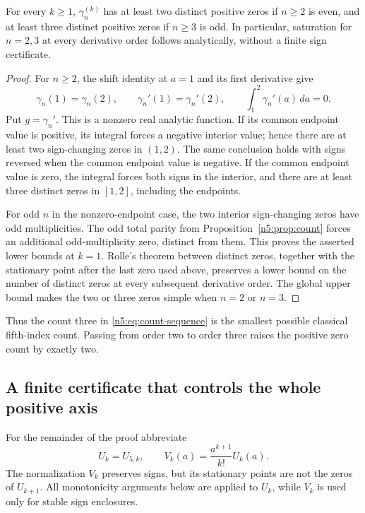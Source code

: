 \begin{proposition}
\label{n5:prop:lower}
For every $k\geq1$, $\gamma_n^{(k)}$ has at least two distinct positive
zeros if $n\geq2$ is even, and at least three distinct positive zeros if
$n\geq3$ is odd.  In particular, saturation for $n=2,3$ at every
derivative order follows analytically, without a finite sign certificate.
\end{proposition}
\begin{proof}
For $n\geq2$, the shift identity at $a=1$ and its first derivative give
\[
 \gamma_n(1)=\gamma_n(2),\qquad
 \gamma_n'(1)=\gamma_n'(2),\qquad
 \int_1^2\gamma_n'(a)\,da=0.
\]
Put $g=\gamma_n'$.  This is a nonzero real analytic function.  If its
common endpoint value is positive, its integral forces a negative
interior value; hence there are at least two sign-changing zeros in
$(1,2)$.  The same conclusion holds with signs reversed when the common
endpoint value is negative.  If the common endpoint value is zero, the
integral forces both signs in the interior, and there are at least three
distinct zeros in $[1,2]$, including the endpoints.

For odd $n$ in the nonzero-endpoint case, the two interior sign-changing
zeros have odd multiplicities.  The odd total parity from
Proposition~\ref{n5:prop:count} forces an additional odd-multiplicity
zero, distinct from them.  This proves the asserted lower bounds at
$k=1$.  Rolle's theorem between distinct zeros, together with the
stationary point after the last zero used above, preserves a lower bound
on the number of distinct zeros at every subsequent derivative order.
The global upper bound makes the two or three zeros simple when
$n=2$ or $n=3$.
\end{proof}

Thus the count three in \eqref{n5:eq:count-sequence} is the smallest
possible classical fifth-index count.  Passing from order two to order
three raises the positive zero count by exactly two.

\subsection{A finite certificate that controls the whole positive axis}

For the remainder of the proof abbreviate
\[
 U_k=U_{5,k},\qquad
 V_k(a)=\frac{a^{k+1}}{k!}U_k(a).
\]
The normalization $V_k$ preserves signs, but its stationary points are
not the zeros of $U_{k+1}$.  All monotonicity arguments below are applied
to $U_k$, while $V_k$ is used only for stable sign enclosures.

